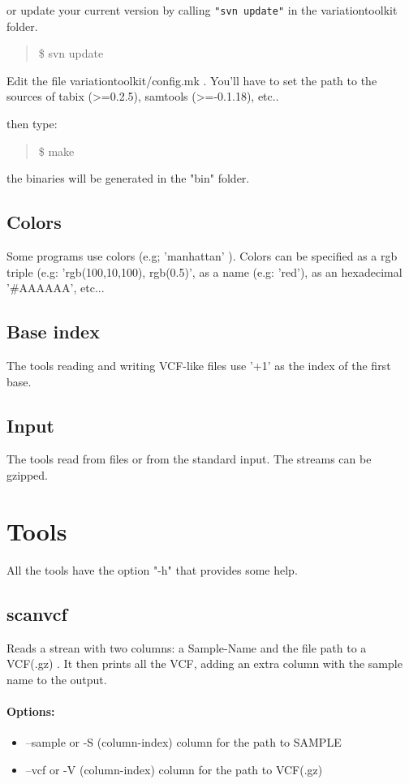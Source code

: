 \documentclass[12pt]{article}
\begin{document}
or update your current version by calling \texttt{"svn update"} in the  variationtoolkit folder.
\begin{quote} 
\$ svn update
\end{quote}

Edit the file variationtoolkit/config.mk . You'll have to set the path to the sources of tabix (>=0.2.5), samtools (>=-0.1.18), etc..

then type:
\begin{quote}
\$ make
\end{quote}
the binaries will be generated in the "bin" folder.

\subsection{Colors}
Some programs use colors (e.g; 'manhattan' ). Colors can be specified as a rgb triple (e.g: 'rgb(100,10,100), rgb(0.5)', as a name (e.g: 'red'), as an hexadecimal '\#AAAAAA', etc...
\subsection{Base index}
The tools reading and writing VCF-like files use '+1' as the index of the first base.
\subsection{Input}
The tools read from files or from the standard input. The streams can be gzipped.

\section{Tools}
All the tools have the option "-h" that provides some help.


\subsection{scanvcf}
Reads a strean with two columns: a Sample-Name and the file path to a VCF(.gz) . It then prints all the VCF, adding an extra column with the sample name to the output.

\paragraph{Options:}
\begin{itemize}
\item--sample or -S (column-index) column for the path to SAMPLE 
\item--vcf or -V (column-index) column for the path to VCF(.gz)
\end{itemize}
\end{document}
